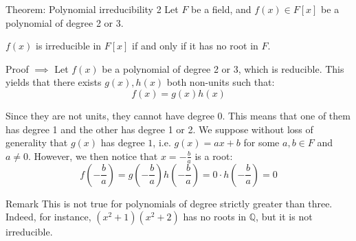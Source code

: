 \documentclass[a4paper]{article}
\begin{document}
\begin{parag}{Theorem: Polynomial irreducibility 2}
    Let $F$ be a field, and $f\left(x\right) \in F\left[x\right]$ be a polynomial of degree 2 or 3.
    
    $f\left(x\right)$ is irreducible in $F\left[x\right]$ if and only if it has no root in $F$.
    
    \begin{subparag}{Proof $\implies$}
        Let $f\left(x\right)$ be a polynomial of degree 2 or 3, which is reducible. This yields that there exists $g\left(x\right), h\left(x\right)$ both non-units such that: 
        \[f\left(x\right) = g\left(x\right)h\left(x\right)\]

        Since they are not units, they cannot have degree $0$. This means that one of them has degree 1 and the other has degree 1 or 2. We suppose without loss of generality that $g\left(x\right)$ has degree $1$, i.e. $g\left(x\right) = ax + b$ for some $a, b \in F$ and $a \neq 0$. However, we then notice that $x = -\frac{b}{a}$ is a root: 
        \[f\left(-\frac{b}{a}\right) = g\left(-\frac{b}{a}\right)h\left(-\frac{b}{a}\right) = 0\cdot h\left(-\frac{b}{a}\right) = 0\]
    \end{subparag}

    \begin{subparag}{Remark}
        This is not true for polynomials of degree strictly greater than three. Indeed, for instance, $\left(x^2 + 1\right)\left(x^2 + 2\right)$ has no roots in $\mathbb{Q}$, but it is not irreducible.
    \end{subparag}
\end{parag}
\end{document}
